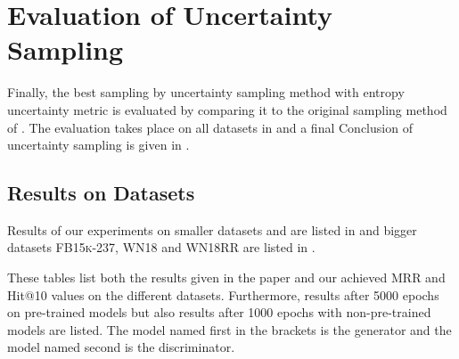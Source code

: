\section{Evaluation of Uncertainty Sampling}
\label{ch:evaluation:sec:evaluation_uncertainty}

Finally, the best sampling by uncertainty sampling method \ussoftmax with entropy uncertainty metric is evaluated by comparing it to the original sampling method \origsampling of \kbgan.
The evaluation takes place on all datasets in  and a final Conclusion of uncertainty sampling is given in .

\subsection{Results on Datasets}







Results of our experiments on smaller datasets \umls and \kinship  are listed in  and bigger datasets \textsc{FB15k-237},  \textsc{WN18} and \textsc{WN18RR} are listed in .


These tables list both the results given in the \kbgan paper \cite{cai2017kbgan} and our achieved MRR and Hit@10 values on the different datasets.
Furthermore, results after 5000 epochs on pre-trained models but also results after 1000 epochs with non-pre-trained models are listed.
The model named first in the brackets is the generator and the model named second is the discriminator.


